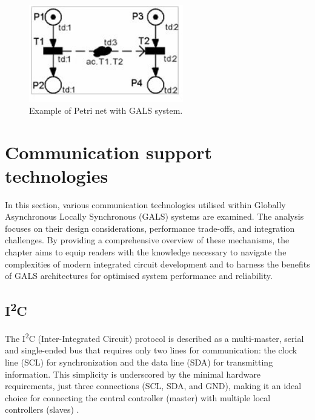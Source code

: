 \begin{figure}[htbp]
  \centering
  \includegraphics[width=0.6\textwidth]{Chapters/Figures/petrigals.jpg}
  \caption{Example of Petri net with GALS system.}
  \label{fig:petrigals}
\end{figure}


%
%
%
%
%

\section{Communication support technologies}
\label{sec:communication_support_technologies}

In this section, various communication technologies utilised within Globally Asynchronous Locally Synchronous (GALS) systems are examined. The analysis focuses on their design considerations, performance trade-offs, and integration challenges. By providing a comprehensive overview of these mechanisms, the chapter aims to equip readers with the knowledge necessary to navigate the complexities of modern integrated circuit development and to harness the benefits of GALS architectures for optimised system performance and reliability.


\subsection{I\textsuperscript{2}C}
\label{subsub:i2c}

The I\textsuperscript{2}C  (Inter-Integrated Circuit) protocol is described as a multi-master, serial and single-ended bus that requires only two lines for communication: the clock line (SCL) for synchronization and the data line (SDA) for transmitting information. This simplicity is underscored by the minimal hardware requirements, just three connections (SCL, SDA, and GND), making it an ideal choice for connecting the central controller (master) with multiple local controllers (slaves) \cite{i2c}.

